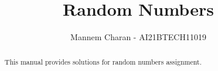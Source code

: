 \documentclass[journal,12pt,twocolumn]{IEEEtran}
\renewcommand\thesection{\arabic{section}}
\begin{document}
\makeatletter
{}
\makeatother
\let\StandardTheFigure\thefigure
\renewcommand{\thefigure}{\thesection}
\makeatletter
{}
\makeatother
\let\StandardTheFigure\thefigure
\let\StandardTheTable\thetable
\let\vec\mathbf
{}
\vspace{3cm}
\title{%
	Random Numbers
}
%
%
%
\author{Mannem Charan - AI21BTECH11019}
\maketitle
\tableofcontents
\bigskip
\renewcommand{\thefigure}{\theenumi}
\renewcommand{\thetable}{\theenumi}

\begin{abstract}
This manual provides solutions for random numbers assignment.
\end{abstract}
\end{document}
